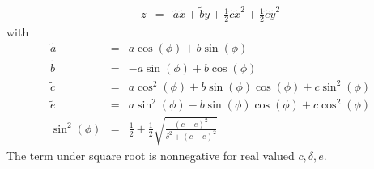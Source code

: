 \documentclass[12pt,a4paper,twoside,openright,BCOR10mm,headsepline,titlepage,abstracton,chapterprefix,final]{scrreprt}
\begin{document}
\begin{eqnarray}
 z &=& \tilde{a} \tilde{x} + \tilde{b} \tilde{y} + \frac{1}{2} \tilde{c} \tilde{x}^2 + \frac{1}{2} \tilde{e} \tilde{y}^2
\end{eqnarray}
with
\begin{eqnarray}
 \tilde{a} &=& a \cos(\phi) + b \sin(\phi) \\
 \tilde{b} &=& -a \sin(\phi) + b \cos(\phi) \\
 \tilde{c} &=& a \cos^2(\phi) + b \sin(\phi) \cos(\phi) + c \sin^2(\phi) \\
 \tilde{e} &=& a \sin^2(\phi) - b \sin(\phi) \cos(\phi) + c \cos^2(\phi) \\
 \sin^2(\phi) &=& \frac{1}{2} \pm \frac{1}{2} \sqrt{ \frac{(c-e)^2}{\delta^2 + (c-e)^2 } }
\end{eqnarray}
The term under square root is nonnegative for real valued $c,\delta,e$. 
\end{document}
